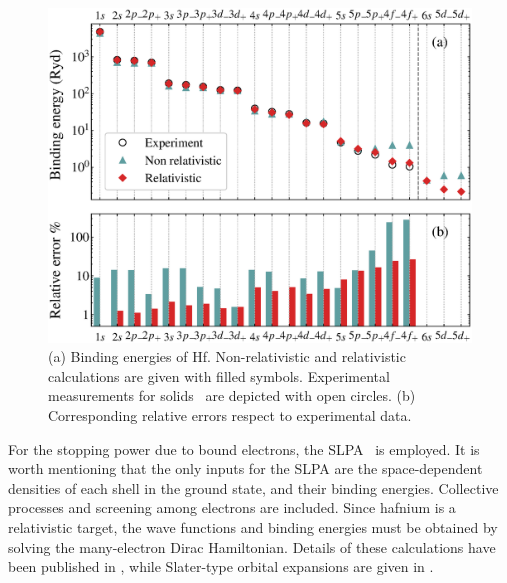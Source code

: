 \documentclass[aps,pra,reprint,groupedaddress,showpacs,showkeys]{revtex4-1}
\begin{document}
\begin{figure}[!t]
\centering
\includegraphics[width=11.cm]{bindener.eps}
\caption{(a) Binding energies of Hf. Non-relativistic and relativistic 
calculations are given with filled symbols. Experimental measurements 
for solids~\cite{williams1995} are depicted with open circles. 
(b) Corresponding relative errors respect to experimental data.}
\label{Binding_E}
\end{figure}

For the stopping power due to bound electrons, the SLPA~\cite{mon17,mon13} 
is employed. It is worth mentioning that the only inputs for the SLPA 
are the space-dependent densities of each shell in the ground state, 
and their binding energies. Collective processes and screening among 
electrons are included. Since hafnium is a relativistic target, the 
wave functions and binding energies must be obtained by solving the 
many-electron Dirac Hamiltonian. Details of these calculations have been 
published in \cite{mendez2019}, while Slater-type orbital expansions are 
given in \cite{Hf_arxiv}. 
\end{document}
